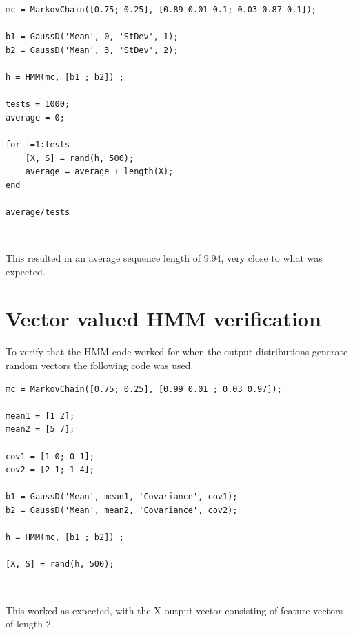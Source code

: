 \documentclass[11pt]{article}   %
\begin{document}
\begin{lstlisting}
mc = MarkovChain([0.75; 0.25], [0.89 0.01 0.1; 0.03 0.87 0.1]);

b1 = GaussD('Mean', 0, 'StDev', 1);
b2 = GaussD('Mean', 3, 'StDev', 2);

h = HMM(mc, [b1 ; b2]) ;

tests = 1000;
average = 0;

for i=1:tests
    [X, S] = rand(h, 500);
    average = average + length(X);
end

average/tests
\end{lstlisting}\
 
 This resulted in an average sequence length of 9.94, very close to what was expected.
 
\newpage
\section{Vector valued HMM verification}

To verify that the HMM code worked for when the output distributions generate random vectors the following code was used.

\begin{lstlisting}mc = MarkovChain([0.75; 0.25], [0.99 0.01 ; 0.03 0.97]);

mean1 = [1 2];
mean2 = [5 7];

cov1 = [1 0; 0 1];
cov2 = [2 1; 1 4];

b1 = GaussD('Mean', mean1, 'Covariance', cov1);
b2 = GaussD('Mean', mean2, 'Covariance', cov2);

h = HMM(mc, [b1 ; b2]) ;

[X, S] = rand(h, 500);
\end{lstlisting}\

This worked as expected, with the X output vector consisting of feature vectors of length 2.
\end{document}
